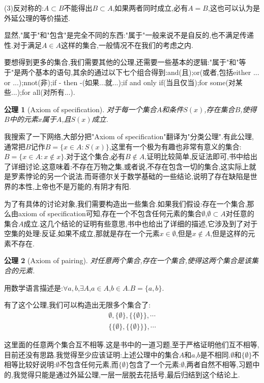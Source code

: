 \documentclass[12pt,a4paper,openany]{book}
\newtheorem{axiom}{公理}[section]
\begin{document}
(3)反对称的:$A \subset B$不能得出$B \subset A$,如果两者同时成立,必有$A = B$,这也可以认为是外延公理的等价描述.

显然,"属于"和"包含"是完全不同的东西:"属于"一般来说不是自反的,也不满足传递性.对于满足$A \in A$这样的集合,一般情况不在我们的考虑之内.

要想得到更多的集合,我们需要其他的公理,还需要一些基本的逻辑:"属于"和"等于"是两个基本的语句,其余的通过以下七个组合得到:and(且);or(或者,包括either ... or ...);nnot(非);if - then -(如果...就...);if and only if(当且仅当);for some(对某些...);for all(对所有...).

\begin{axiom}[Axiom of specification]
对于每一个集合$A$和条件$S(x)$,存在集合$B$,使得$B$中的元素$x$属于$A$,且$S(x)$成立.
\end{axiom}

我搜索了一下网络,大部分把"Axiom of specification"翻译为"分类公理".有此公理,通常把$B$记作$B=\{x \in A: S(x)\}$,这里有一个极为有趣也非常有意义的集合:$B=\{x \in A: x \notin x\}$.对于这个集合,必有$B \notin A$,证明比较简单,反证法即可,书中给出了详细讨论,这意味着:不存在万物之集,或者说,不存在包含一切的集合,这实际上就是罗素悖论的另一个说法.而哥德尔关于数学基础的一些结论,说明了存在缺陷是世界的本性,上帝也不是万能的,有阴才有阳.

为了有具体的讨论对象,我们需要构造出一些集合.如果我们假设:存在一个集合,那么由axiom of specification可知,存在一个不包含任何元素的集合$\emptyset$,$\emptyset \subset A$对任意的集合$A$成立.这几个结论的证明有些意思,书中也给出了详细的描述,它涉及到了对于空集的处理:反证,如果不成立,那就是存在一个元素$x \in \emptyset$,但是$x \notin A$,但是这样的元素不存在.

\begin{axiom}[Axiom of pairing]
对任意两个集合,存在一个集合,使得这两个集合是该集合的元素.
\end{axiom}

用数学语言描述是:$\forall a,b$,$\exists A$,$a \in A$,$b \in A$.$B=\{a,b\}$.

有了这个公理,我们可以构造出无限多个集合了:
\begin{gather*}
\emptyset,\{\emptyset\},\{\{\emptyset\}\},\cdots\\
\{\{\emptyset\},\{\{\emptyset\}\}\},\cdots
\end{gather*}

这里面的任意两个集合互不相等.这是书中的一道习题,至于严格证明他们互不相等,目前还没有思路.我觉得至少应该证明:上述公理中的集合$A$和$a$,$b$是不相同.$\emptyset$和$\{\emptyset\}$不相等比较好说明:$\emptyset$不包含任何元素,而$\{\emptyset\}$包含了一个元素:$\emptyset$,两者自然不相等,习题中的,我觉得只能是通过外延公理,一层一层脱去花括号,最后归结到这个结论上.
\end{document}
